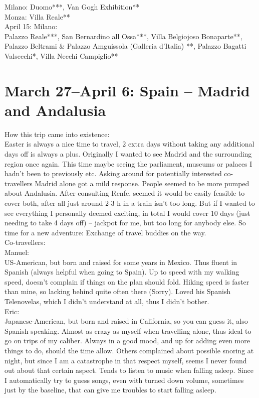 Milano: Duomo***, Van Gogh Exhibition**\\
Monza: Villa Reale**\\

April 15: Milano:\\
Palazzo Reale***, San Bernardino all Ossa***, Villa Belgiojoso Bonaparte**, Palazzo Beltrami \& Palazzo Amguissola (Galleria d'Italia) **, Palazzo Bagatti Valsecchi*, Villa Necchi Campiglio**

\section{March 27--April 6: Spain -- Madrid and Andalusia}
\label{2015:Spain}

How this trip came into existence:\\
Easter is always a nice time to travel, 2 extra days without taking any additional days off is always a plus. Originally I wanted to see Madrid and the surrounding region once again.  This time maybe seeing the parliament, museums or palaces I hadn't been to previously etc. Asking around for potentially interested co-travellers Madrid alone got a mild response. People seemed to be more pumped about Andalusia. After consulting Renfe, seemed it would be easily feasible to cover both, after all just around 2-3 h in a train isn't too long. But if I wanted to see everything I personally deemed exciting, in total I would cover 10 days (just needing to take 4 days off) -- jackpot for me, but too long for anybody else. So time for a new adventure: Exchange of travel buddies on the way.\\

Co-travellers: \\
Manuel:\\
US-American, but born and raised for some years in Mexico. Thus fluent in Spanish (always helpful when going to Spain). Up to speed with my walking speed, doesn't complain if things on the plan should fold. Hiking speed is faster than mine, so lacking behind quite often there (Sorry). Loved his Spanish Telenovelas, which I didn't understand at all, thus I didn't bother. \\

Eric:\\
Japanese-American, but born and raised in California, so you can guess it, also Spanish speaking. Almost as crazy as myself when travelling alone, thus ideal to go on trips of my caliber. Always in a good mood, and up for adding even more things to do, should the time allow. Others complained about possible snoring at night, but since I am a catastrophe in that respect myself, seems I never found out about that certain aspect. Tends to listen to music when falling asleep. Since I automatically try to guess songs, even with turned down volume, sometimes just by the baseline, that can give me troubles to start falling asleep. \\

